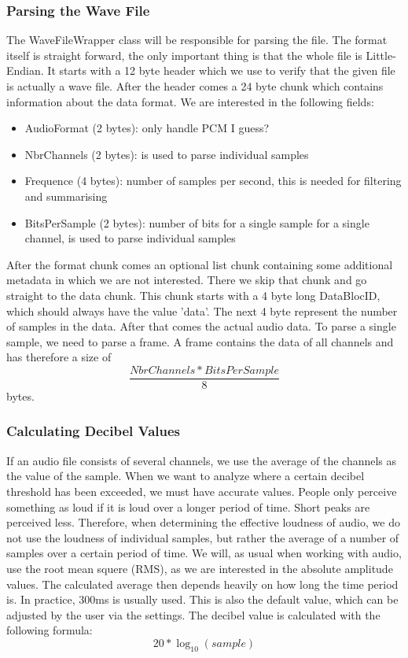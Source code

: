 \subsubsection{Parsing the Wave File}
The WaveFileWrapper class will be responsible for parsing the file.
The format itself is straight forward\cite{wav_file_format_wikipedia}, the only important thing is that the whole file is Little-Endian.
It starts with a 12 byte header which we use to verify that the given file is actually a wave file.
After the header comes a 24 byte chunk which contains information about the data format.
We are interested in the following fields:
\begin{itemize}
    \item AudioFormat (2 bytes): only handle PCM I guess?
    \item NbrChannels (2 bytes): is used to parse individual samples
    \item Frequence (4 bytes): number of samples per second, this is needed for filtering and summarising
    \item BitsPerSample (2 bytes): number of bits for a single sample for a single channel, is used to parse individual samples
\end{itemize}
After the format chunk comes an optional list chunk containing some additional metadata in which we are not interested.
There we skip that chunk and go straight to the data chunk.
This chunk starts with a 4 byte long DataBlocID, which should always have the value 'data'.
The next 4 byte represent the number of samples in the data.
After that comes the actual audio data.
To parse a single sample, we need to parse a frame.
A frame contains the data of all channels and has therefore a size of \[\frac{NbrChannels * BitsPerSample}{8}\] bytes.

\subsubsection{Calculating Decibel Values}
If an audio file consists of several channels, we use the average of the channels as the value of the sample.
When we want to analyze where a certain decibel threshold has been exceeded, we must have accurate values.
People only perceive something as loud if it is loud over a longer period of time.
Short peaks are perceived less.
Therefore, when determining the effective loudness of audio, we do not use the loudness of individual samples, but rather the average of a number of samples over a certain period of time. We will, as usual when working with audio, use the root mean squere (RMS), as we are interested in the absolute amplitude values.
The calculated average then depends heavily on how long the time period is.
In practice, 300ms is usually used\cite{timespan_for_audio_rms_calculate}.
This is also the default value, which can be adjusted by the user via the settings.
The decibel value is calculated with the following formula\cite{decibel_wikipedia}:
\[20 * \log_{10} (sample)\]

